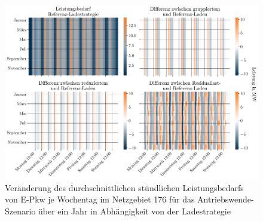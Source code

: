 \begin{figure}[H]
    \centering
    \includegraphics[width=\textwidth]{Bilder/residual_load_diff}
    \caption{Veränderung des durchschnittlichen stündlichen Leistungsbedarfs von E-Pkw je Wochentag im Netzgebiet \num{176} für das Antriebswende-Szenario über ein Jahr in Abhängigkeit von der Ladestrategie}\label{fig:residual_load_diff}
\end{figure}
